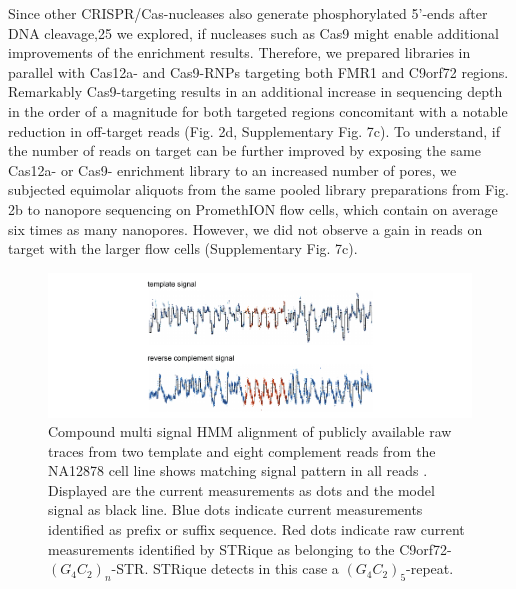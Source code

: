 Since other CRISPR/Cas-nucleases also generate phosphorylated 5’-ends after DNA cleavage,25 we explored, if nucleases such as Cas9 might enable additional improvements of the enrichment results. Therefore, we prepared libraries in parallel with Cas12a- and Cas9-RNPs targeting both FMR1 and C9orf72 regions. Remarkably Cas9-targeting results in an additional increase in sequencing depth in the order of a magnitude for both targeted regions concomitant with a notable reduction in off-target reads (Fig. 2d, Supplementary Fig. 7c). To understand, if the number of reads on target can be further improved by exposing the same Cas12a- or Cas9- enrichment library to an increased number of pores, we subjected equimolar aliquots from the same pooled library preparations from Fig. 2b to nanopore sequencing on PromethION flow cells, which contain on average six times as many nanopores. However, we did not observe a gain in reads on target with the larger flow cells (Supplementary Fig. 7c).



\begin{figure}[h]
    \centering
    \includegraphics[width=1.0\textwidth]{figures/strique/signal.pdf}
    \captionsetup{format=plain}
    \caption[Nanopore raw signal of the C9orf72 STR in NA12878 cells]{Compound multi signal HMM alignment of publicly available raw traces from two template and eight complement reads from the NA12878 cell line shows matching signal pattern in all reads \cite{Jain2018}. Displayed are the current measurements as dots and the model signal as black line. Blue dots indicate current measurements identified as prefix or suffix sequence. Red dots indicate raw current measurements identified by STRique as belonging to the C9orf72-$ (G_{4}C_{2})_{n} $-STR. STRique detects in this case a $ (G_{4}C_{2})_{5} $-repeat.}
    \label{fig:strique:signal}
\end{figure}


